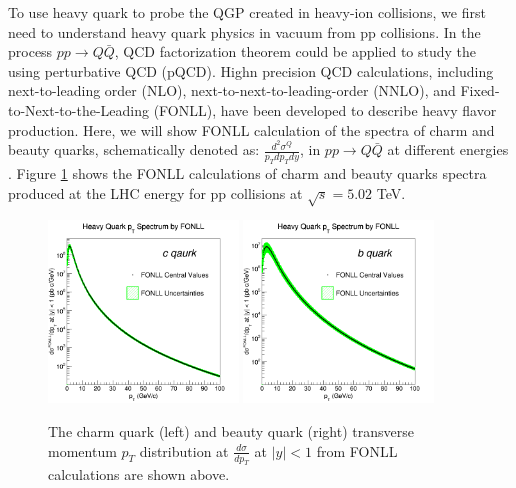 To use heavy quark to probe the QGP created in heavy-ion collisions, we first need to understand heavy quark physics in vacuum from pp collisions. In the process $pp \rightarrow Q \bar Q$, QCD factorization theorem could be applied to study the using perturbative QCD (pQCD). Highn precision QCD calculations, including next-to-leading order (NLO), next-to-next-to-leading-order (NNLO), and Fixed-to-Next-to-the-Leading (FONLL), have been developed to describe heavy flavor production. Here, we will show FONLL calculation of the spectra of charm and beauty quarks, schematically denoted as: $\frac{d^2\sigma^Q}{p_T dp_T dy}$, in $pp \rightarrow Q  \bar Q$ at different energies \cite{FONLLRef}. Figure \ref{FONLL} shows the FONLL calculations of charm and beauty quarks spectra produced at the LHC energy for pp collisions at $\sqrt s = 5.02$ TeV.

 \begin{figure}[hbtp]
\begin{center}
\includegraphics[width=0.45\textwidth]{Figures/Chapter1/Charm.png}
\includegraphics[width=0.45\textwidth]{Figures/Chapter1/Beauty.png}
\caption{The charm quark (left) and beauty quark (right) transverse momentum $p_T$ distribution at $\frac{d\sigma}{dp_T}$ at $|y| < 1$ from FONLL calculations are shown above.}
\label{FONLL}
\end{center}
\end{figure}   

